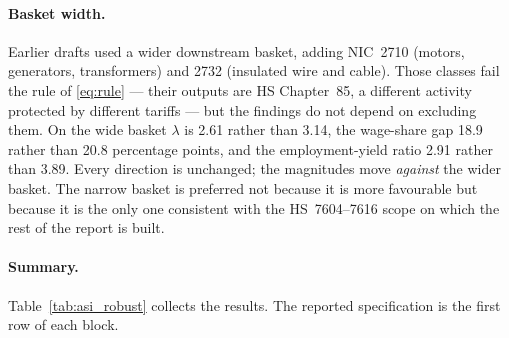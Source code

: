 \documentclass[11pt, a4paper]{article}
\numberwithin{figure}{section}
\numberwithin{table}{section}
\begin{document}
\paragraph{Basket width.} Earlier drafts used a wider downstream basket, adding
NIC~2710 (motors, generators, transformers) and 2732 (insulated wire and cable).
Those classes fail the rule of \eqref{eq:rule} --- their outputs are HS Chapter~85, a
different activity protected by different tariffs --- but the findings do not depend on
excluding them. On the wide basket $\lambda$ is 2.61 rather than 3.14, the wage-share
gap 18.9 rather than 20.8 percentage points, and the employment-yield ratio 2.91
rather than 3.89. Every direction is unchanged; the magnitudes move \emph{against} the
wider basket. The narrow basket is preferred not because it is more favourable but
because it is the only one consistent with the HS~7604--7616 scope on which the rest of
the report is built.

\paragraph{Summary.} Table~\ref{tab:asi_robust} collects the results. The reported
specification is the first row of each block.
\end{document}
